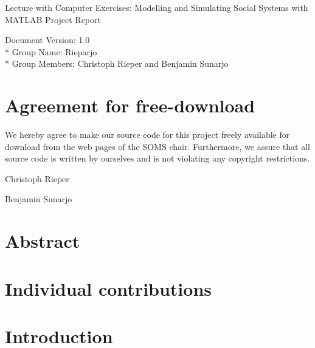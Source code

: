 \documentclass[a4paper, DIV11, abstracton]{scrartcl}
\begin{document}
\title{}
\author{Christoph Rieper and Benjamin Sunarjo}


\maketitle
Lecture with Computer Exercises: Modelling and Simulating Social Systems with MATLAB
Project Report

Document Version: 1.0\\*
Group Name: Rieparjo\\*
Group Members: Christoph Rieper and Benjamin Sunarjo



\newpage
\section*{Agreement for free-download}

We hereby agree to make our source code for this project freely available for download from the web pages of the SOMS chair. Furthermore, we assure that all source code is written by ourselves and is not violating any copyright restrictions.

\bigskip
Christoph Rieper

\bigskip
Benjamin Sunarjo

\newpage


\tableofcontents

\newpage
\setcounter{page}{1}	%
\pagestyle{plain}
\section*{Abstract}

\section*{Individual contributions}

\section{Introduction}
\end{document}
